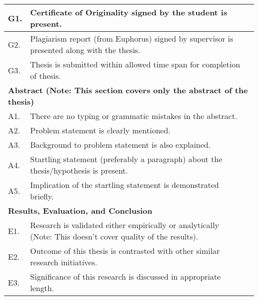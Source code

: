 \begin{table}[!ht]
\begin{adjustbox}{width=\linewidth,center}
\begin{tabular}{p{0.6cm}p{9cm}p{0.6cm}}
\multicolumn{1}{|l|}{G1.} & \multicolumn{1}{l|}{Certificate of Originality signed by   the student is present.}                                                  & \multicolumn{1}{l|}{} \\ \midrule
\multicolumn{1}{|l|}{G2.} & \multicolumn{1}{l|}{Plagiarism   report (from Euphorus) signed by supervisor is presented along with the   thesis.}                  & \multicolumn{1}{l|}{} \\ \midrule
\multicolumn{1}{|l|}{G3.} & \multicolumn{1}{l|}{Thesis is submitted   within allowed time span for completion of thesis.}                                        & \multicolumn{1}{l|}{} \\ \midrule
\multicolumn{3}{|l|}{\textbf{Abstract (Note:   This section covers only the abstract of the thesis)}}                                                                                    \\ \midrule
\multicolumn{1}{|l|}{A1.} & \multicolumn{1}{l|}{There are no typing or grammatic   mistakes in the abstract.}                                                    & \multicolumn{1}{l|}{} \\ \midrule
\multicolumn{1}{|l|}{A2.} & \multicolumn{1}{l|}{Problem statement is   clearly mentioned.}                                                                       & \multicolumn{1}{l|}{} \\ \midrule
\multicolumn{1}{|l|}{A3.} & \multicolumn{1}{l|}{Background to problem   statement is also explained.}                                                            & \multicolumn{1}{l|}{} \\ \midrule
\multicolumn{1}{|l|}{A4.} & \multicolumn{1}{l|}{Startling statement   (preferably a paragraph) about the thesis/hypothesis is present.}                          & \multicolumn{1}{l|}{} \\ \midrule
\multicolumn{1}{|l|}{A5.} & \multicolumn{1}{l|}{Implication of the   startling statement is demonstrated briefly.}                                               & \multicolumn{1}{l|}{} \\ \midrule
\multicolumn{3}{|l|}{\textbf{Results, Evaluation, and Conclusion}}                                                                                                                       \\ \midrule
\multicolumn{1}{|l|}{E1.} & \multicolumn{1}{l|}{Research is   validated either empirically or analytically (Note: This doesn’t cover   quality of the results).} & \multicolumn{1}{l|}{} \\ \midrule
\multicolumn{1}{|l|}{E2.} & \multicolumn{1}{l|}{Outcome of this   thesis is contrasted with other similar research initiatives.}                                 & \multicolumn{1}{l|}{} \\ \midrule
\multicolumn{1}{|l|}{E3.} & \multicolumn{1}{l|}{Significance of this   research is discussed in appropriate length.} \\ \midrule
\end{tabular}
\end{adjustbox}
\end{table}